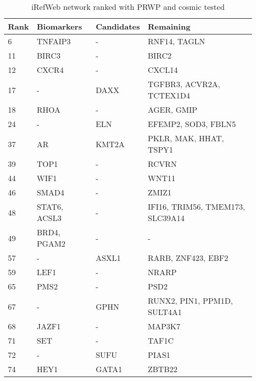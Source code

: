 \begin{table}
    \begin{tabular}{|p{1cm}|p{3cm}|p{3cm}|p{4cm}|}
        \hline
        \textbf{Rank} & \textbf{Biomarkers} & \textbf{Candidates} & \textbf{Remaining} \\
        \hline
        6	& TNFAIP3	& -	& RNF14, TAGLN \\
        \hline
        11	& BIRC3	& -	& BIRC2 \\
        \hline
        12	& CXCR4	& -	& CXCL14 \\
        \hline
        17	& -	& DAXX	& TGFBR3, ACVR2A, TCTEX1D4 \\
        \hline
        18	& RHOA	& -	& AGER, GMIP \\
        \hline
        24	& -	& ELN	& EFEMP2, SOD3, FBLN5 \\
        \hline
        37	& AR	& KMT2A	& PKLR, MAK, HHAT, TSPY1 \\
        \hline
        39	& TOP1	& -	& RCVRN \\
        \hline
        44	& WIF1	& -	& WNT11 \\
        \hline
        46	& SMAD4	& -	& ZMIZ1 \\
        \hline
        48	& STAT6, ACSL3	& -	& IFI16, TRIM56, TMEM173, SLC39A14 \\
        \hline
        49	& BRD4, PGAM2	& -	& - \\
        \hline
        57	& -	& ASXL1	& RARB, ZNF423, EBF2 \\
        \hline
        59	& LEF1	& -	& NRARP \\
        \hline
        65	& PMS2	& -	& PSD2 \\
        \hline
        67	& -	& GPHN	& RUNX2, PIN1, PPM1D, SULT4A1 \\
        \hline
        68	& JAZF1	& -	& MAP3K7 \\
        \hline
        71	& SET	& -	& TAF1C \\
        \hline
        72	& -	& SUFU	& PIAS1 \\
        \hline
        74	& HEY1	& GATA1	& ZBTB22 \\
        \hline
    \end{tabular}
    \caption{iRefWeb network ranked with PRWP and cosmic tested}
    \label{tab:prwp-cosmic}
\end{table}

